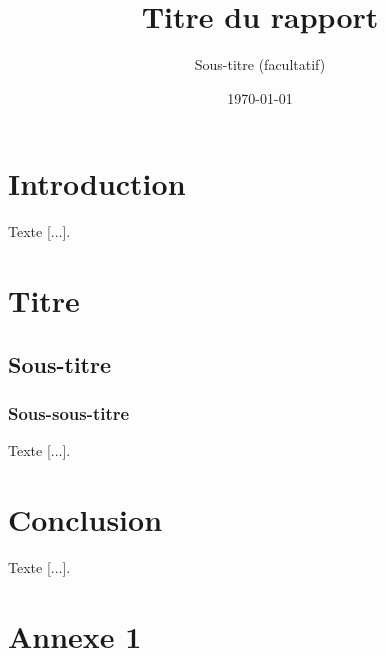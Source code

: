 \documentclass{poly}
\title{Titre du rapport}
\subtitle{Sous-titre (facultatif)}
\date{\today}
\begin{document}
\maketitle
{}
\tableofcontents
\listoffigures
\listoftables

\newpage
{}
\setcounter{page}{1}

\section{Introduction}

Texte [...].

\section{Titre}

\subsection{Sous-titre}

\subsubsection{Sous-sous-titre}

Texte [...].

\section{Conclusion}

Texte [...].

\newpage

\printbibliography

\newpage

\appendix

\section{Annexe 1}
\end{document}
